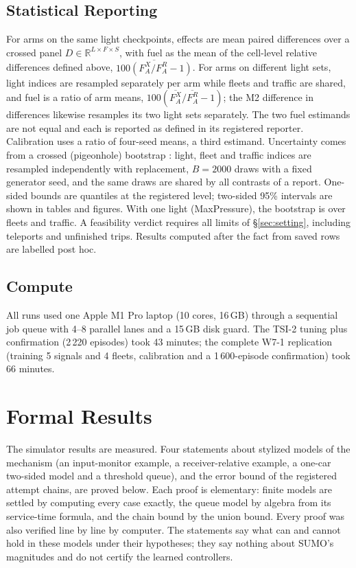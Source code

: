 \subsection{Statistical Reporting}\label{sec:stats}
For arms on the same light checkpoints, effects are mean paired differences over a crossed panel $D\in\mathbb R^{L\times F\times S}$,
with fuel as the mean of the cell-level relative differences defined above, $\overline{100(F_A^X/F_A^R-1)}$. For arms on different light
sets, light indices are resampled separately per arm while fleets and traffic are shared, and fuel is a ratio of arm means,
$100(\overline{F_A^X}/\overline{F_A^R}-1)$; the M2 difference in differences likewise resamples its two light sets separately. The two
fuel estimands are not equal and each is reported as defined in its registered reporter. Calibration uses a ratio of four-seed means, a
third estimand. Uncertainty
comes from a crossed (pigeonhole) bootstrap \cite{owen2007,efron1993}: light, fleet and traffic indices are resampled independently with
replacement, $B=2000$ draws with a fixed generator seed, and the same draws are shared by all contrasts of a report. One-sided bounds are
quantiles at the registered level; two-sided 95\% intervals are shown in tables and figures. With one light (MaxPressure), the bootstrap is
over fleets and traffic. A feasibility verdict requires all limits of §\ref{sec:setting}, including teleports and unfinished trips.
Results computed after the fact from saved rows are labelled post hoc.

\subsection{Compute}
All runs used one Apple M1 Pro laptop (10 cores, 16\,GB) through a sequential job queue with 4--8 parallel lanes and a 15\,GB disk guard.
The TSI-2 tuning plus confirmation (2\,220 episodes) took 43 minutes; the complete W7-1 replication (training 5 signals and 4 fleets,
calibration and a 1\,600-episode confirmation) took 66 minutes.

\section{Formal Results}\label{sec:verification}
The simulator results are measured. Four statements about stylized models of the mechanism (an input-monitor example, a
receiver-relative example, a one-car two-sided model and a threshold queue), and the error bound of the registered attempt chains, are
proved below. Each proof is elementary: finite models are settled by computing every case exactly, the queue model by algebra from its
service-time formula, and the chain bound by the union bound. Every proof was also verified line by line by computer. The statements say
what can and cannot hold in these models under their hypotheses; they say nothing about SUMO's magnitudes and do not certify the learned
controllers.

